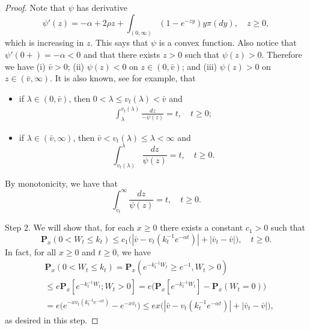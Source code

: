 \documentclass[12pt,a4paper]{amsart}
\theoremstyle{plain}
\theoremstyle{definition}
\numberwithin{equation}{section}
\begin{document}
\begin{proof}
  Note that $\psi$ has derivative
  \[
    \psi'(z)
    = -\alpha + 2\rho z + \int_{(0,\infty)}(1-e^{-zy})y\pi(dy),\quad z\geq 0,
  \]
  which is increasing in $z$.
  This says that $\psi$ is a convex function.
  Also notice that $\psi'(0+)=-\alpha <0$ and that there exists $z>0$ such that $\psi(z)>0$.
  Therefore we have
  (i) $\bar v > 0$; (ii) $\psi(z) < 0$ on $z\in (0,\bar v)$; and (iii) $\psi(z) > 0 $ on $z\in (\bar v, \infty)$.
  It is also known, see \cite[Proposition 3.3]{Li2011Measure-valued} for example, that
  \begin{itemize}
  \item
    if $\lambda \in (0,\bar v)$, then $0<\lambda \leq v_t(\lambda)<\bar v $ and
    \begin{align}
      \label{CSBP: int}
    \int_{\lambda}^{v_t(\lambda)} \frac{dz}{-\psi(z)} = t, \quad t\geq 0;
    \end{align}
  \item
    if $\lambda \in (\bar v, \infty)$, then $\bar v < v_t(\lambda)\leq \lambda< \infty $ and
    \[
      \int_{v_t(\lambda)}^\lambda\frac{dz}{\psi(z)} = t, \quad t\geq 0.
    \]
  \end{itemize}
  By monotonicity, we have that
  \begin{equation}
    \label{eq:svp2}
    \int_{\bar v_t}^\infty \frac{dz}{\psi(z)} = t, \quad t\geq 0.
  \end{equation} 
    
  Step 2. We will show that, for each $x \geq 0$ there exists a constant $c_1>0$ such that
  \[
    \mathbf P_{x}(0< W_t\leq k_t)
    \leq c_1\big(|\bar v- v_t(k_t^{-1}e^{-\alpha t})|+|\bar v_t - \bar v|\big),
    \quad t\geq 0.
  \]
  In fact, for all $x\geq 0$ and $t\geq 0$, we have
  \begin{align}
    & \mathbf P_{x}(0<W_t \leq k_t)
      = \mathbf P_{x}( e^{-k_t^{-1}W_t}\geq e^{-1},W_t > 0) \\
    & \leq e \mathbf P_{x}[e^{-k_t^{-1} W_t};W_t > 0]
      =  e\big(\mathbf P_x[e^{-k_t^{-1} W_t}]-\mathbf P_x(W_t = 0)\big) \\ 
    & = e\big(e^{-xv_t(k_t^{-1} e^{-\alpha t})}-e^{-x\bar v_t}\big)
      \leq ex \big(|\bar v-v_t(k_t^{-1} e^{-\alpha t})|+ |\bar v_t- \bar v|\big),
  \end{align}
  as desired in this step.
  

\end{proof}
\end{document}
